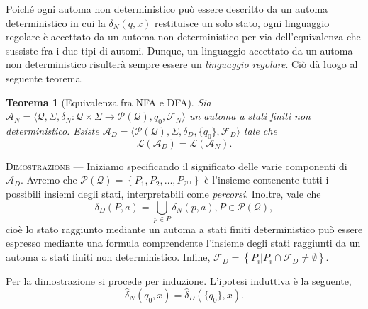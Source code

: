 \documentclass[10pt]{\classname}
\theoremstyle{newlinethm}
\newtheorem{thm}{Teorema}[section]
\theoremstyle{theorem}
\theoremstyle{definition}
\theoremstyle{definition}
\theoremstyle{definition}
\theoremstyle{definition}
\begin{document}
\clearpage

Poiché ogni automa non deterministico può essere descritto da un automa
deterministico in cui la $\delta_N(q, x)$ restituisce un solo stato, ogni
linguaggio regolare è accettato da un automa non deterministico per via
dell'equivalenza che sussiste fra i due tipi di automi. Dunque, un linguaggio
accettato da un automa non deterministico risulterà sempre essere
un \emph{linguaggio regolare}. Ciò dà luogo al seguente teorema.

\begin{thm}[Equivalenza fra NFA e DFA]
    Sia $\mathcal A_N = \langle \mathcal Q, \Sigma, \delta_N : \mathcal Q \times \Sigma \rightarrow \mathcal P ( \mathcal Q ), q_0, \mathcal F_N \rangle$ un automa a stati finiti non deterministico. Esiste $\mathcal A_D = \langle \mathcal P ( \mathcal Q ), \Sigma, \delta_D, \{q_0\}, \mathcal F_D \rangle$ tale che \[\mathcal L (\mathcal A_D) = \mathcal L (\mathcal A_N).\]
\end{thm}

\textsc{Dimostrazione} --- Iniziamo specificando il significato delle varie componenti di $\mathcal A_D$. Avremo che $\mathcal P (\mathcal Q) = \left\{P_1, P_2, \dots, P_{2^m}\right\}$ è l'insieme contenente tutti i possibili insiemi degli stati, interpretabili come \emph{percorsi}. Inoltre, vale che \[\delta_D (P, a) = \bigcup_{p \in P} \delta_N(p, a), P \in \mathcal P ( \mathcal Q),\] cioè lo stato raggiunto mediante un automa a stati finiti deterministico può essere espresso mediante una formula comprendente l'insieme degli stati raggiunti da un automa a stati finiti non deterministico. Infine, $\mathcal F_D = \left\{P_i | P_i \cap \mathcal F_D \neq \emptyset\right\}$.

Per la dimostrazione si procede per induzione. L'ipotesi induttiva è la seguente, \[\hat \delta_N (q_0, x) = \hat \delta_D(\{q_0\}, x).\]
\end{document}
